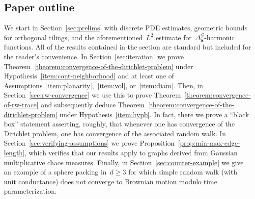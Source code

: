\documentclass[12pt]{amsart}
\numberwithin{equation}{section}
\newcommand{\aDelta}{\hyperref[eq:geometric-laplacian]{{\Delta^{\mathcal{G}}_{\cond}}}}
\newcommand{\cond}{\hyperref[eq:geometric-laplacian]{\mathbf{a}}}
\begin{document}
\subsection{Paper outline} 
We start in Section~\ref{sec:prelims} with discrete PDE estimates, geometric bounds for orthogonal tilings, and the aforementioned~$L^2$ estimate for~$\aDelta$-harmonic functions. All of the results contained in the section are standard but included for the reader's convenience. In Section~\ref{sec:iteration} we prove Theorem~\ref{theorem:convergence-of-the-dirichlet-problem} under Hypothesis~\ref{item:cont-neighborhood} and at least one of Assumptions~\ref{item:planarity},~\ref{item:vol}, or~\ref{item:diam}. 
Then, in Section~\ref{sec:rw-convergence} we use this to prove Theorem~\ref{theorem:convergence-of-rw-trace} and subsequently deduce Theorem~\ref{theorem:convergence-of-the-dirichlet-problem} under Hypothesis~\ref{item:hypb}. In fact, there we prove a ``black box'' statement asserting, roughly, that whenever one has convergence of the Dirichlet problem, one has convergence of the associated random walk. In Section~\ref{sec:verifying-assumptions} we prove Proposition~\ref{prop:min-max-edge-length}, which verifies that our results apply to graphs derived from Gaussian multiplicative chaos measures. 
Finally, in Section~\ref{sec:counter-example} we give an example of a sphere packing in~$d \geq 3$ for which simple random walk (with unit conductance)
does not converge to Brownian motion modulo time parameterization. 
\end{document}
